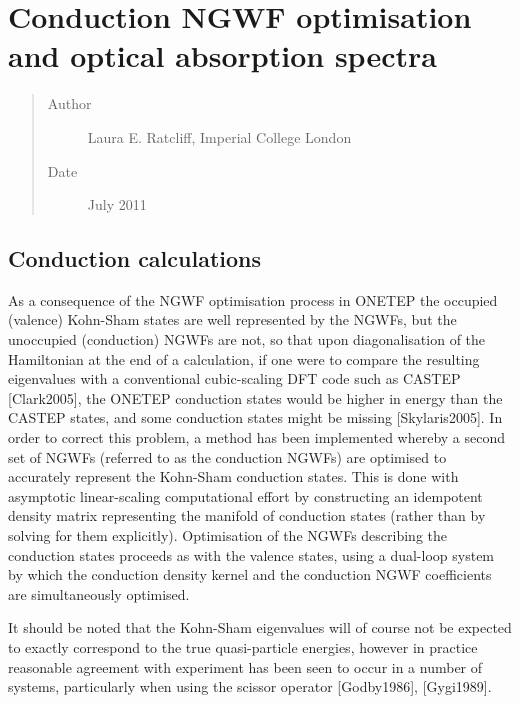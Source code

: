 \documentclass[letterpaper,10pt,english]{sphinxmanual}
\begin{document}
\section{Conduction NGWF optimisation and optical absorption spectra}
\label{\detokenize{conduction::doc}}\label{\detokenize{conduction:conduction-ngwf-optimisation-and-optical-absorption-spectra}}\begin{quote}\begin{description}
\item[{Author}] \leavevmode
Laura E. Ratcliff, Imperial College London

\item[{Date}] \leavevmode
July 2011

\end{description}\end{quote}


\subsection{Conduction calculations}
\label{\detokenize{conduction:conduction-calculations}}
As a consequence of the NGWF optimisation process in ONETEP the occupied
(valence) Kohn-Sham states are well represented by the NGWFs, but the
unoccupied (conduction) NGWFs are not, so that upon diagonalisation of
the Hamiltonian at the end of a calculation, if one were to compare the
resulting eigenvalues with a conventional cubic-scaling DFT code such as
CASTEP {[}Clark2005{]}, the ONETEP conduction states would be
higher in energy than the CASTEP states, and some conduction states
might be missing {[}Skylaris2005{]}. In order to correct this
problem, a method has been implemented whereby a second set of NGWFs
(referred to as the conduction NGWFs) are optimised to accurately
represent the Kohn-Sham conduction states. This is done with asymptotic
linear-scaling computational effort by constructing an idempotent
density matrix representing the manifold of conduction states (rather
than by solving for them explicitly). Optimisation of the NGWFs
describing the conduction states proceeds as with the valence states,
using a dual-loop system by which the conduction density kernel and the
conduction NGWF coefficients are simultaneously optimised.

It should be noted that the Kohn-Sham eigenvalues will of course not be
expected to exactly correspond to the true quasi-particle energies,
however in practice reasonable agreement with experiment has been seen
to occur in a number of systems, particularly when using the scissor
operator {[}Godby1986{]}, {[}Gygi1989{]}.
\end{document}
